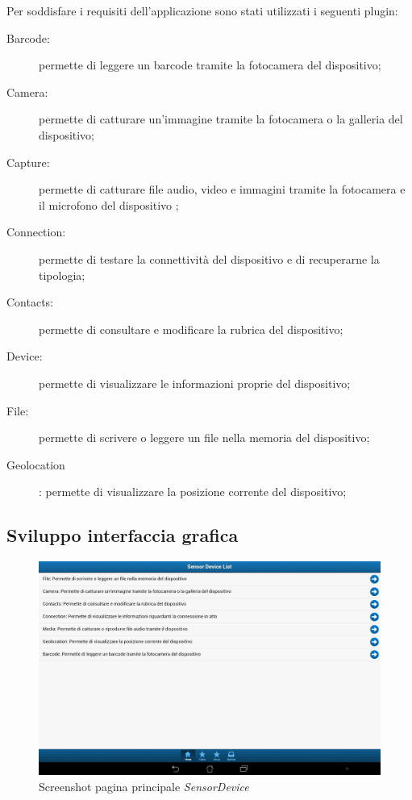 Per soddisfare i requisiti dell'applicazione sono stati utilizzati i seguenti plugin:
\begin{description}
\item[Barcode\footnotemark:] permette di leggere un barcode tramite la fotocamera del dispositivo;
\item[Camera:] permette di catturare un'immagine tramite la fotocamera o la galleria del dispositivo;
\item[Capture:] permette di catturare file audio, video e immagini tramite la fotocamera e il microfono del dispositivo ;
\item[Connection:] permette di testare la connettività del dispositivo e di recuperarne la tipologia;
\item[Contacts:] permette di consultare e modificare la rubrica del dispositivo;
\item[Device:] permette di visualizzare le informazioni proprie del dispositivo;
\item[File:] permette di scrivere o leggere un file nella memoria del dispositivo;
\item [Geolocation]: permette di visualizzare la posizione corrente del dispositivo;
\end{description}

\clearpage

\subsection{Sviluppo interfaccia grafica}

\begin{figure}[htb]
\centering
\includegraphics[scale=0.25]{gfx/screenshot/screen_sensorDevice}
\caption{Screenshot pagina principale \emph{SensorDevice}}
\label{fig:screenshot sensordevice}
\end{figure}

